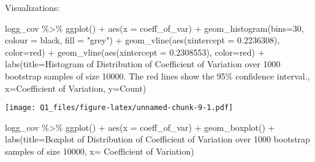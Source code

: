 \documentclass[
]{article}
\newenvironment{Shaded}{\begin{snugshade}}{\end{snugshade}}
\newcommand{\AttributeTok}[1]{\textcolor[rgb]{0.77,0.63,0.00}{#1}}
\newcommand{\DecValTok}[1]{\textcolor[rgb]{0.00,0.00,0.81}{#1}}
\newcommand{\FloatTok}[1]{\textcolor[rgb]{0.00,0.00,0.81}{#1}}
\newcommand{\FunctionTok}[1]{\textcolor[rgb]{0.00,0.00,0.00}{#1}}
\newcommand{\NormalTok}[1]{#1}
\newcommand{\SpecialCharTok}[1]{\textcolor[rgb]{0.00,0.00,0.00}{#1}}
\newcommand{\StringTok}[1]{\textcolor[rgb]{0.31,0.60,0.02}{#1}}
\begin{document}
Visualizations:

\begin{Shaded}
\begin{Highlighting}[]
\NormalTok{logg\_cov }\SpecialCharTok{\%\textgreater{}\%} \FunctionTok{ggplot}\NormalTok{() }\SpecialCharTok{+} \FunctionTok{aes}\NormalTok{(}\AttributeTok{x =}\NormalTok{ coeff\_of\_var) }\SpecialCharTok{+} 
  \FunctionTok{geom\_histogram}\NormalTok{(}\AttributeTok{bins=}\DecValTok{30}\NormalTok{, }\AttributeTok{colour =} \StringTok{\textquotesingle{}black\textquotesingle{}}\NormalTok{, }\AttributeTok{fill =} \StringTok{"grey"}\NormalTok{) }\SpecialCharTok{+} 
  \FunctionTok{geom\_vline}\NormalTok{(}\FunctionTok{aes}\NormalTok{(}\AttributeTok{xintercept =} \FloatTok{0.2236308}\NormalTok{), }\AttributeTok{color=}\StringTok{\textquotesingle{}red\textquotesingle{}}\NormalTok{) }\SpecialCharTok{+} 
  \FunctionTok{geom\_vline}\NormalTok{(}\FunctionTok{aes}\NormalTok{(}\AttributeTok{xintercept =} \FloatTok{0.2308553}\NormalTok{), }\AttributeTok{color=}\StringTok{\textquotesingle{}red\textquotesingle{}}\NormalTok{) }\SpecialCharTok{+}
  \FunctionTok{labs}\NormalTok{(}\AttributeTok{title=}\StringTok{\textquotesingle{}Histogram of Distribution of Coefficient of Variation over 1000 bootstrap samples}
\StringTok{  of size 10000. The red lines show the 95\% confidence interval.\textquotesingle{}}\NormalTok{,}
       \AttributeTok{x=}\StringTok{\textquotesingle{}Coefficient of Variation\textquotesingle{}}\NormalTok{, }\AttributeTok{y=}\StringTok{\textquotesingle{}Count\textquotesingle{}}\NormalTok{)}
\end{Highlighting}
\end{Shaded}

\texttt{[image: Q1\_files/figure-latex/unnamed-chunk-9-1.pdf]}

\begin{Shaded}
\begin{Highlighting}[]
\NormalTok{logg\_cov }\SpecialCharTok{\%\textgreater{}\%} \FunctionTok{ggplot}\NormalTok{() }\SpecialCharTok{+} \FunctionTok{aes}\NormalTok{(}\AttributeTok{x =}\NormalTok{ coeff\_of\_var) }\SpecialCharTok{+} 
  \FunctionTok{geom\_boxplot}\NormalTok{() }\SpecialCharTok{+} 
  \FunctionTok{labs}\NormalTok{(}\AttributeTok{title=}\StringTok{\textquotesingle{}Boxplot of Distribution of Coefficient of Variation over 1000 bootstrap samples }
\StringTok{       of size 10000\textquotesingle{}}\NormalTok{, }
       \AttributeTok{x=} \StringTok{\textquotesingle{}Coefficient of Variation\textquotesingle{}}\NormalTok{)}
\end{Highlighting}
\end{Shaded}
\end{document}
